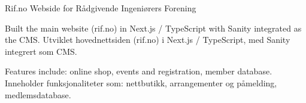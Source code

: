 \cvselected
{Rif.no}
{%
  {Webside for Rådgivende Ingeniørers Forening}}
{}


\begin{cvbullets}
  \item \enor
  {Built the main website (rif.no) in Next.js / TypeScript with
    Sanity integrated as the CMS.}
  {Utviklet hovednettsiden (rif.no) i Next.js / TypeScript, med
    Sanity integrert som CMS.}
  \item \enor
  {Features include: online shop, events and registration, member
    database.}
  {Inneholder funksjonaliteter som: nettbutikk, arrangementer og
    påmelding, medlemsdatabase.}
\end{cvbullets}
